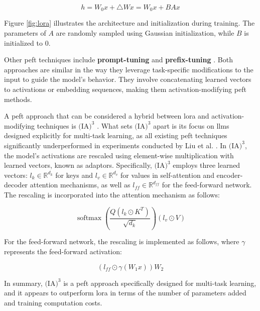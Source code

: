 \begin{equation}
    h = W_0x + \triangle Wx = W_0x + BAx
\end{equation}

Figure \ref{fig:lora} illustrates the architecture and initialization during training. The parameters of \(A\) are randomly sampled using Gaussian initialization, while \(B\) is initialized to 0.

Other \gls{peft} techniques include \textbf{prompt-tuning} \cite{lester_power_2021} and \textbf{prefix-tuning} \cite{li_prefix-tuning_2021}. Both approaches are similar in the way they leverage task-specific modifications to the input to guide the model's behavior. They involve concatenating learned vectors to activations or embedding sequences, making them activation-modifying \gls{peft} methods.

A \gls{peft} approach that can be considered a hybrid between \gls{lora} and activation-modifying techniques is \textbf{$\text{(IA)}^3$} \cite{liu_few-shot_2022}. What sets $\text{(IA)}^3$ apart is its focus on \gls{llm}s designed explicitly for multi-task learning, as all existing \gls{peft} techniques significantly underperformed in experiments conducted by Liu et al. \cite{liu_few-shot_2022}. In $\text{(IA)}^3$, the model's activations are rescaled using element-wise multiplication with learned vectors, known as adaptors. Specifically, $\text{(IA)}^3$ employs three learned vectors: \(l_k \in \mathbb{R}^{d_k}\) for keys and \(l_v \in \mathbb{R}^{d_v}\) for values in self-attention and encoder-decoder attention mechanisms, as well as \(l_{ff} \in \mathbb{R}^{d_{ff}}\) for the feed-forward network. The rescaling is incorporated into the attention mechanism as follows:

\begin{equation}
    \operatorname{softmax}\left(\frac{Q\left(l_{k} \odot K^T\right)}{\sqrt{d_k}}\right)\left(l_{v} \odot V\right)
\end{equation}

For the feed-forward network, the rescaling is implemented as follows, where \(\gamma\) represents the feed-forward activation:

\begin{equation}
    (l_{ff} \odot \gamma (W_1x))W_2
\end{equation}

In summary, \textbf{$\text{(IA)}^3$} is a \gls{peft} approach specifically designed for multi-task learning, and it appears to outperform \gls{lora} in terms of the number of parameters added and training computation costs.

